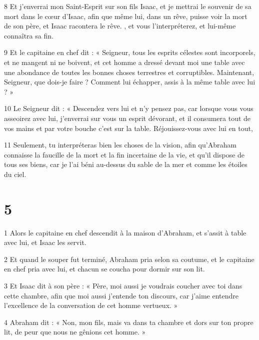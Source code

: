 \par 8 Et j'enverrai mon Saint-Esprit sur son fils Isaac, et je mettrai le souvenir de sa mort dans le cœur d'Isaac, afin que même lui, dans un rêve, puisse voir la mort de son père, et Isaac racontera le rêve. , et vous l’interpréterez, et lui-même connaîtra sa fin.

\par 9 Et le capitaine en chef dit : « Seigneur, tous les esprits célestes sont incorporels, et ne mangent ni ne boivent, et cet homme a dressé devant moi une table avec une abondance de toutes les bonnes choses terrestres et corruptibles. Maintenant, Seigneur, que dois-je faire ? Comment lui échapper, assis à la même table avec lui ? »

\par 10 Le Seigneur dit : « Descendez vers lui et n'y pensez pas, car lorsque vous vous asseoirez avec lui, j'enverrai sur vous un esprit dévorant, et il consumera tout de vos mains et par votre bouche c'est sur la table. Réjouissez-vous avec lui en tout,

\par 11 Seulement, tu interpréteras bien les choses de la vision, afin qu'Abraham connaisse la faucille de la mort et la fin incertaine de la vie, et qu'il dispose de tous ses biens, car je l'ai béni au-dessus du sable de la mer et comme les étoiles du ciel.

\chapter{5}

\par 1 Alors le capitaine en chef descendit à la maison d'Abraham, et s'assit à table avec lui, et Isaac les servit.

\par 2 Et quand le souper fut terminé, Abraham pria selon sa coutume, et le capitaine en chef pria avec lui, et chacun se coucha pour dormir sur son lit.

\par 3 Et Isaac dit à son père : « Père, moi aussi je voudrais coucher avec toi dans cette chambre, afin que moi aussi j'entende ton discours, car j'aime entendre l'excellence de la conversation de cet homme vertueux. »

\par 4 Abraham dit : « Non, mon fils, mais va dans ta chambre et dors sur ton propre lit, de peur que nous ne gênions cet homme. »

